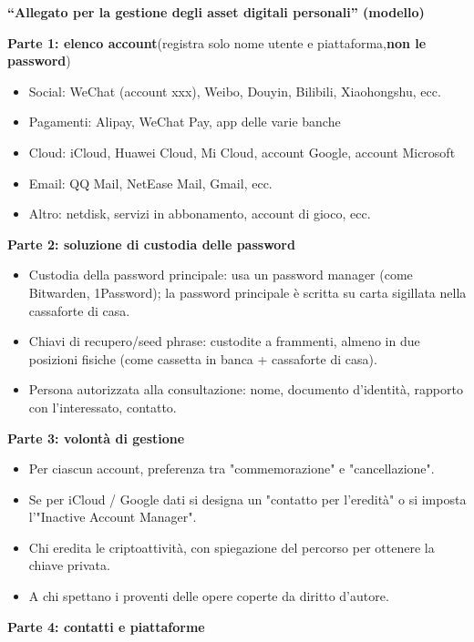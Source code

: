 \textbf{“Allegato per la gestione degli asset digitali personali” (modello)}\par

\textbf{Parte 1: elenco account}(registra solo nome utente e piattaforma,\textbf{non le password})

\begin{itemize}
  \item Social: WeChat (account xxx), Weibo, Douyin, Bilibili, Xiaohongshu, ecc.
  \item Pagamenti: Alipay, WeChat Pay, app delle varie banche
  \item Cloud: iCloud, Huawei Cloud, Mi Cloud, account Google, account Microsoft
  \item Email: QQ Mail, NetEase Mail, Gmail, ecc.
  \item Altro: netdisk, servizi in abbonamento, account di gioco, ecc.
\end{itemize}

\textbf{Parte 2: soluzione di custodia delle password}

\begin{itemize}
  \item Custodia della password principale: usa un password manager (come Bitwarden, 1Password); la password principale è scritta su carta sigillata nella cassaforte di casa.
  \item Chiavi di recupero/seed phrase: custodite a frammenti, almeno in due posizioni fisiche (come cassetta in banca + cassaforte di casa).
  \item Persona autorizzata alla consultazione: nome, documento d'identità, rapporto con l'interessato, contatto.
\end{itemize}

\textbf{Parte 3: volontà di gestione}

\begin{itemize}
  \item Per ciascun account, preferenza tra "commemorazione" e "cancellazione".
  \item Se per iCloud / Google dati si designa un "contatto per l'eredità" o si imposta l'"Inactive Account Manager".
  \item Chi eredita le criptoattività, con spiegazione del percorso per ottenere la chiave privata.
  \item A chi spettano i proventi delle opere coperte da diritto d'autore.
\end{itemize}

\textbf{Parte 4: contatti e piattaforme}

